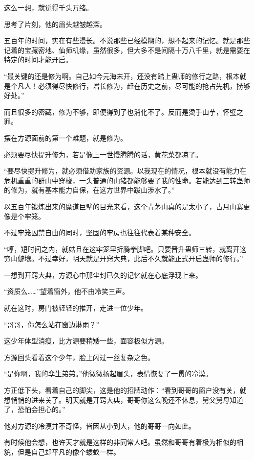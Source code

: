 \begin{this_body}
这么一想，就觉得千头万绪。

思考了片刻，他的眉头越皱越深。

五百年的时间，实在有些漫长。不说那些已经模糊的，想不起来的记忆。就是那些记着的宝藏密地、仙师机缘，虽然很多，但大多不是间隔十万八千里，就是需要在特定的时间才能开启。

“最关键的还是修为啊。自己如今元海未开，还没有踏上蛊师的修行之路，根本就是个凡人！必须得尽快修行，增长修为，赶在历史之前，尽可能的抢占先机，捞够好处。”

而且很多的密藏，修为不够，即便得到了也消化不了。反而是烫手山芋，怀璧之罪。

摆在方源面前的第一个难题，就是修为。

必须要尽快提升修为，若是像上一世慢腾腾的话，黄花菜都凉了。

“要尽快提升修为，就必须借助家族的资源。以我现在的情况，根本就没有能力在危机重重的群山中穿梭，一头普通的山猪都能够要了我的性命。若能达到三转蛊师的修为，就有基本能力自保，在这方世界中跋山涉水了。”

以五百年锻炼出来的魔道巨擘的目光来看，这个青茅山真的是太小了，古月山寨更像是个牢笼。

不过牢笼囚禁自由的同时，坚固的牢房也往往代表着某种安全。

“哼，短时间之内，就姑且在这牢笼里折腾拳脚吧。只要晋升蛊师三转，就离开这穷山僻壤。不过幸好，明天就是开窍大典，此后不久就能正式开启蛊师的修行。”

一想到开窍大典，方源心中那尘封已久的记忆就在心底浮现上来。

“资质么……”望着窗外，他不由冷笑三声。

就在这时，房门被轻轻的推开，走进一位少年。

“哥哥，你怎么站在窗边淋雨？”

这少年体型消瘦，比方源要稍矮一些，面容极似方源。

方源回头看着这个少年，脸上闪过一丝复杂之色。

“是你啊，我的孪生弟弟。”他微微扬起眉头，表情恢复了一贯的冷漠。

方正低下头，看着自己的脚尖，这是他的招牌动作：“看到哥哥的窗户没有关，就想悄悄的进来关了。明天就是开窍大典，哥哥你这么晚还不休息，舅父舅母知道了，恐怕会担心的。”

他对方源的冷漠并不奇怪，皆因从小到大，他的哥哥一向如此。

有时候他会想，也许天才就是这样的非同常人吧。虽然和哥哥有着极为相似的相貌，但是自己却平凡的像个蝼蚁一样。


\end{this_body}
